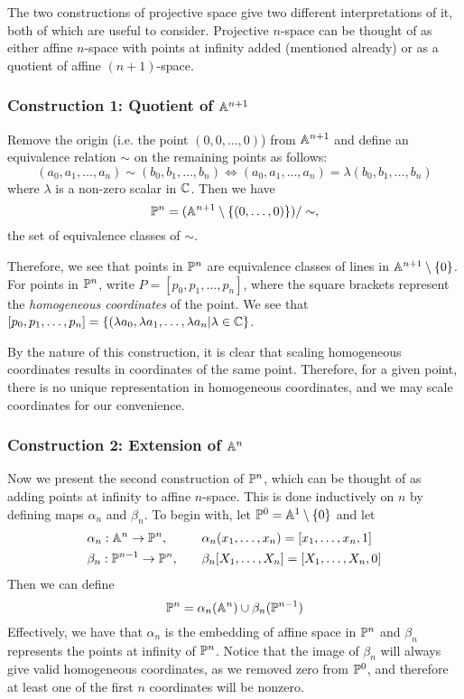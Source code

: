 The two constructions of projective space give two different interpretations of it, both of which are useful to consider.
Projective $n$-space can be thought of as either affine $n$-space with points at infinity added (mentioned already) or as a quotient of affine $(n+1)$-space.

\subsubsection{Construction 1: Quotient of $\an[n+1]$}
Remove the origin (i.e. the point $(0,0,\ldots,0)$) from $\an[n+1]$ and define an equivalence relation $\sim$ on the remaining points as follows:
$$(a_0,a_1,\ldots,a_n) \sim (b_0,b_1,\ldots,b_n) \iff (a_0,a_1,\ldots,a_n) = \lambda(b_0,b_1,\ldots,b_n)$$
where $\lambda$ is a non-zero scalar in $\C$. Then we have 
$$\pn = (\an[n+1]\setminus\{(0,\ldots,0)\})/\sim,$$
the set of equivalence classes of $\sim$.

Therefore, we see that points in $\pn$ are equivalence classes of lines in $\an[n+1] \setminus \{0\}$.
For points in $\pn$, write $P = [p_0,p_1,\ldots,p_n]$, where the square brackets represent the \emph{homogeneous coordinates} of the point.
We see that $[p_0,p_1,\ldots,p_n] = \{(\lambda a_0, \lambda a_1,\ldots,\lambda a_n | \lambda \in \C\}$.

By the nature of this construction, it is clear that scaling homogeneous coordinates results in coordinates of the same point.
Therefore, for a given point, there is no unique representation in homogeneous coordinates, and we may scale coordinates for our convenience.

\subsubsection{Construction 2: Extension of $\an[n]$}
Now we present the second construction of $\pn$, which can be thought of as adding points at infinity to affine $n$-space.
This is done inductively on $n$ by defining maps $\alpha_n$ and $\beta_n$.
To begin with, let $\pn[0] = \an[1] \setminus \{0\}$ and let
\begin{alignat*}{2}
&\alpha_n : \an \rightarrow \pn,\quad &&\alpha_n(x_1,\ldots,x_n) = [x_1,\ldots,x_n,1]\\
 &\beta_n : \pn[n-1] \rightarrow \pn,\quad &&\beta_n[X_1,\ldots,X_n] = [X_1,\ldots,X_n,0]
\end{alignat*}
Then we can define
$$\pn = \alpha_n(\an) \cup \beta_n(\pn[n-1])$$
Effectively, we have that $\alpha_n$ is the embedding of affine space in $\pn$ and $\beta_n$ represents the points at infinity of $\pn$.
Notice that the image of $\beta_n$ will always give valid homogeneous coordinates, as we removed zero from $\pn[0]$, and therefore at least one of the first $n$ coordinates will be nonzero.
